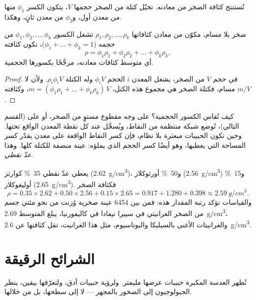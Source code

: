 تُستنتج كثافة الصخر من معادنه. تخيّل كتلة من الصخر
حجمها $V$، يتكون الكسر $\phi_1$ منها من معدن أول، و$\phi_2$ من
معدن ثانٍ، وهكذا.

\begin{proposition}\label{prop:g11:minerals:density}
صخر بلا مسام، مكوّن من معادن كثافاتها $\rho_1, \rho_2, \dots,
\rho_k$ تشغل الكسور $\phi_1, \phi_2, \dots, \phi_k$ من حجمه
($\phi_1 + \dots + \phi_k = 1$)، تكون كثافته
\[
  \rho = \phi_1 \rho_1 + \phi_2 \rho_2 + \dots + \phi_k \rho_k ,
\]
أي متوسط كثافات معادنه، مرجَّحًا بكسورها
الحجمية.
\end{proposition}

\begin{proof}
في حجم $V$ من الصخر، يشغل المعدن $i$ الحجم $\phi_i V$ وله
الكتلة $\rho_i \phi_i V$. ولأن لا مسام، فكتلة الصخر هي مجموع
هذه الكتل، $m = (\phi_1 \rho_1 + \dots + \phi_k \rho_k)\,V$،
وكثافته $m/V$.
\end{proof}

كيف تُقاس الكسور الحجمية؟ على وجه مقطوع مستوٍ من الصخر، أو على
 (القسم التالي)، تُوضع شبكة منتظمة من النقاط، ويُسجَّل عند
كل نقطة المعدن الواقع تحتها. وحين تكون الحبيبات مبعثرة
بلا نظام، فإن كسر النقاط الواقعة على معدن يقدّر
كسر المساحة التي يغطيها، وهو أيضًا كسر
الحجم الذي يملؤه:  عينة منصفة للكتلة كلها. وهذا
\emph{عدّ نقطي}.

\begin{example}
يعطي عدّ نقطي \qty{35}{\percent} كوارتز (\qty{2.62}{g/cm^3})،
و\qty{50}{\percent} أورثوكلاز (\qty{2.56}{g/cm^3}) و\qty{15}{\percent}
أوليغوكلاز (\qty{2.65}{g/cm^3}). فكثافة الصخر
\[
  \rho = 0.35 \times 2.62 + 0.50 \times 2.56 + 0.15 \times 2.65
       = 0.917 + 1.280 + 0.398 \approx \qty{2.59}{g/cm^3}.
\]
والقياسات تؤكد رتبة المقدار هذه: فمن بين \num{6454} عينة صخرية
وُزنت من نحو مئتي جسم من الصخر الغرانيتي في سييرا نيفادا في
كاليفورنيا، يبلغ المتوسط \qty{2.69}{g/cm^3}، والغرانيتات الأغنى
بالسيليكا والبوتاسيوم، مثل هذا الغرانيت، تقل كثافتها عن \qty{2.6}{g/cm^3}.
\end{example}

\section{الشرائح الرقيقة}

تُظهر العدسة المكبرة حبيبات عرضها مليمتر. ولرؤية حبيبات أدق،
ولتعرّفها بيقين، ينظر الجيولوجيون إلى الصخور بالمجهر
--- لا إلى سطحها، بل من خلالها.

